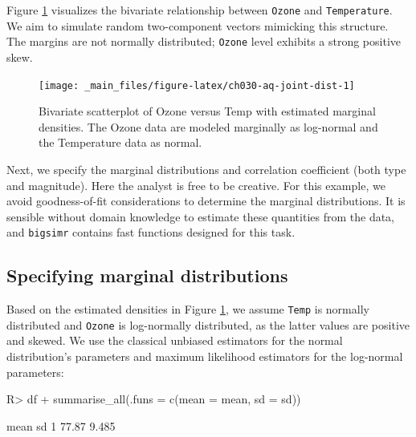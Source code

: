 \documentclass[
]{jss}
\begin{document}
Figure \ref{fig:ch030-aq-joint-dist} visualizes the bivariate relationship between \texttt{Ozone} and \texttt{Temperature}. We aim to simulate random two-component vectors mimicking this structure. The margins are not normally distributed; \texttt{Ozone} level exhibits a strong positive skew.

\begin{CodeChunk}
\begin{figure}

{\centering \texttt{[image: \_main\_files/figure-latex/ch030-aq-joint-dist-1]} 

}

\caption[Bivariate scatterplot of Ozone versus Temp with estimated marginal densities]{Bivariate scatterplot of Ozone versus Temp with estimated marginal densities. The Ozone data are modeled marginally as log-normal and the Temperature data as normal.}\label{fig:ch030-aq-joint-dist}
\end{figure}
\end{CodeChunk}

Next, we specify the marginal distributions and correlation coefficient (both type and magnitude). Here the analyst is free to be creative. For this example, we avoid goodness-of-fit considerations to determine the marginal distributions. It is sensible without domain knowledge to estimate these quantities from the data, and \texttt{bigsimr} contains fast functions designed for this task.

\hypertarget{specifying-marginal-distributions}{%
\subsection{Specifying marginal distributions}\label{specifying-marginal-distributions}}

Based on the estimated densities in Figure \ref{fig:ch030-aq-joint-dist}, we assume \texttt{Temp} is normally distributed and \texttt{Ozone} is log-normally distributed, as the latter values are positive and skewed. We use the classical unbiased estimators for the normal distribution's parameters and maximum likelihood estimators for the log-normal parameters:

\begin{CodeChunk}
\begin{CodeInput}
R> df %
+   summarise_all(.funs = c(mean = mean, sd = sd))
\end{CodeInput}
\begin{CodeOutput}
   mean    sd
1 77.87 9.485
\end{CodeOutput}
\end{CodeChunk}
\end{document}
